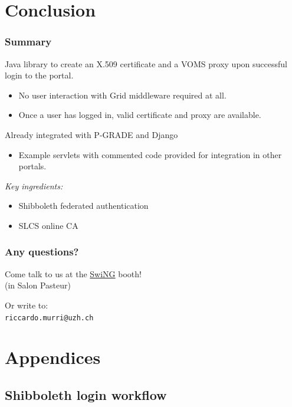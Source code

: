 \documentclass{beamer}
\newcommand{\+}{\vspace{1em}}
\begin{document}
\section{Conclusion}
\label{sec:conclusion}

\begin{frame}[label=summary]
  \frametitle{Summary}
  
  Java library to create an X.509 certificate and a VOMS proxy upon
  successful login to the portal.
  \begin{itemize}
  \item No user interaction with Grid middleware required at all.
  \item Once a user has logged in, valid certificate and proxy are
    available.
  \end{itemize}

  \+
  Already integrated with P-GRADE and Django
  \begin{itemize}
  \item Example servlets with commented code provided for integration
    in other portals.
  \end{itemize}

  \+
  \emph{Key ingredients:}
  \begin{itemize}
  \item Shibboleth federated authentication
  \item SLCS online CA
  \end{itemize}
\end{frame}


\begin{frame}
  \frametitle{Any questions?}
  \begin{center}\Large
    {Come talk to us at the 
      \href{http://www.swing-grid.ch/}{SwiNG} booth!
      \\ (in Salon Pasteur)}

    \+
    {Or write to: \\ \texttt{riccardo.murri@uzh.ch}}
  \end{center}
\end{frame}




\section{Appendices}


\subsection{Shibboleth login workflow}
\end{document}
